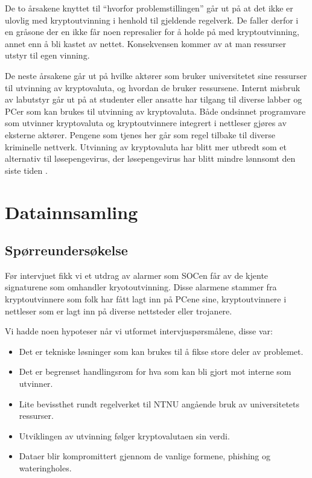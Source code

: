 De to årsakene knyttet til ``hvorfor problemstillingen'' går ut på at det ikke er ulovlig med kryptoutvinning i henhold til gjeldende regelverk. De faller derfor i en gråsone der en ikke får noen represalier for å holde på med kryptoutvinning, annet enn å bli kastet av nettet. Konsekvensen kommer av at man ressurser utstyr til egen vinning.

De neste årsakene går ut på hvilke aktører som bruker universitetet sine ressurser til utvinning av kryptovaluta, og hvordan de bruker ressursene. Internt misbruk av labutstyr går ut på at studenter eller ansatte har tilgang til diverse labber og PCer som kan brukes til utvinning av kryptovaluta. Både ondsinnet programvare som utvinner kryptovaluta og kryptoutvinnere integrert i nettleser gjøres av eksterne aktører. Pengene som tjenes her går som regel tilbake til diverse kriminelle nettverk. Utvinning av kryptovaluta har blitt mer utbredt som et alternativ til løsepengevirus, der løsepengevirus har blitt mindre lønnsomt den siste tiden \cite{RW}.

\section{Datainnsamling}
\subsection{Spørreundersøkelse}
Før intervjuet fikk vi et utdrag av alarmer som SOCen får av de kjente signaturene som omhandler kryotoutvinning. Disse alarmene stammer fra kryptoutvinnere som folk har fått lagt inn på PCene sine, kryptoutvinnere i nettleser som er lagt inn på diverse nettsteder eller trojanere. 

Vi hadde noen hypoteser når vi utformet intervjuspørsmålene, disse var:
\begin{itemize}
    \item Det er tekniske løsninger som kan brukes til å fikse store deler av problemet.
    \item Det er begrenset handlingsrom for hva som kan bli gjort mot interne som utvinner.
    \item Lite bevissthet rundt regelverket til NTNU angående bruk av universitetets ressurser.
    \item Utviklingen av utvinning følger kryptovalutaen sin verdi.
    \item Dataer blir kompromittert gjennom de vanlige formene, phishing og wateringholes.
\end{itemize}

